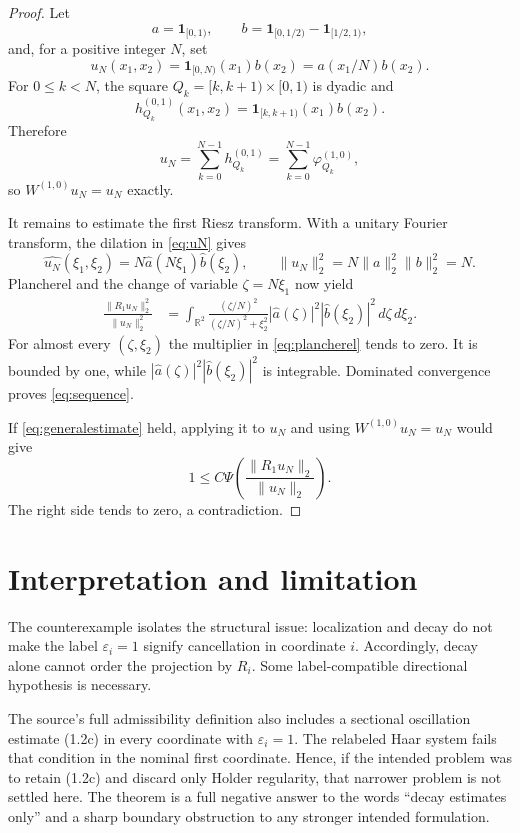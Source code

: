 \documentclass[11pt]{article}
\newcommand{\R}{\mathbb R}
\newcommand{\1}{\mathbf 1}
\begin{document}
\begin{proof}
Let
\[
 a=\1_{[0,1)},
 \qquad b=\1_{[0,1/2)}-\1_{[1/2,1)},
\]
and, for a positive integer $N$, set
\begin{equation}
 u_N(x_1,x_2)=\1_{[0,N)}(x_1)b(x_2)=a(x_1/N)b(x_2).
 \label{eq:uN}
\end{equation}
For $0\leq k<N$, the square
$Q_k=[k,k+1)\times[0,1)$ is dyadic and
\[
 h_{Q_k}^{(0,1)}(x_1,x_2)=\1_{[k,k+1)}(x_1)b(x_2).
\]
Therefore
\[
 u_N=\sum_{k=0}^{N-1}h_{Q_k}^{(0,1)}
     =\sum_{k=0}^{N-1}\varphi_{Q_k}^{(1,0)},
\]
so $W^{(1,0)}u_N=u_N$ exactly.

It remains to estimate the first Riesz transform. With a unitary Fourier
transform, the dilation in \eqref{eq:uN} gives
\[
 \widehat{u_N}(\xi_1,\xi_2)
 =N\widehat a(N\xi_1)\widehat b(\xi_2),
 \qquad \|u_N\|_2^2=N\|a\|_2^2\|b\|_2^2=N.
\]
Plancherel and the change of variable $\zeta=N\xi_1$ now yield
\begin{align}
 \frac{\|R_1u_N\|_2^2}{\|u_N\|_2^2}
 &=\int_{\R^2}
 \frac{(\zeta/N)^2}{(\zeta/N)^2+\xi_2^2}
 |\widehat a(\zeta)|^2|\widehat b(\xi_2)|^2
 \,d\zeta\,d\xi_2.
 \label{eq:plancherel}
\end{align}
For almost every $(\zeta,\xi_2)$ the multiplier in
\eqref{eq:plancherel} tends to zero. It is bounded by one, while
$|\widehat a(\zeta)|^2|\widehat b(\xi_2)|^2$ is integrable. Dominated
convergence proves \eqref{eq:sequence}.

If \eqref{eq:generalestimate} held, applying it to $u_N$ and using
$W^{(1,0)}u_N=u_N$ would give
\[
 1\leq C\Psi\!\left(\frac{\|R_1u_N\|_2}{\|u_N\|_2}\right).
\]
The right side tends to zero, a contradiction.
\end{proof}

\section{Interpretation and limitation}

The counterexample isolates the structural issue: localization and decay do
not make the label $\varepsilon_i=1$ signify cancellation in coordinate $i$.
Accordingly, decay alone cannot order the projection by $R_i$. Some
label-compatible directional hypothesis is necessary.

The source's full admissibility definition also includes a sectional
oscillation estimate (1.2c) in every coordinate with
$\varepsilon_i=1$. The relabeled Haar system fails that condition in the
nominal first coordinate. Hence, if the intended problem was to retain
(1.2c) and discard only Holder regularity, that narrower problem is not
settled here. The theorem is a full negative answer to the words ``decay
estimates only'' and a sharp boundary obstruction to any stronger intended
formulation.
\end{document}
